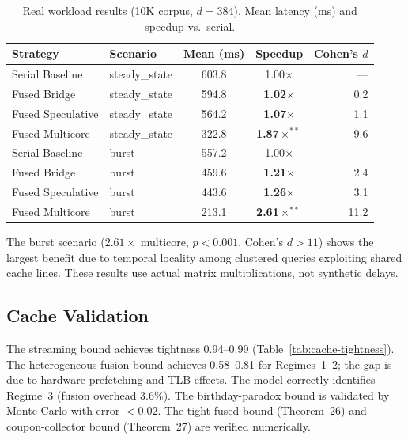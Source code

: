 \documentclass{article}
\theoremstyle{definition}
\theoremstyle{remark}
\begin{document}
\begin{table}[t]
\centering
\caption{Real workload results (10K corpus, $d{=}384$). Mean latency (ms) and speedup vs.\ serial.}\label{tab:real-workload}
\smallskip
\begin{tabular}{@{}llccr@{}}
\toprule
\textbf{Strategy} & \textbf{Scenario} & \textbf{Mean (ms)} & \textbf{Speedup} & \textbf{Cohen's $d$} \\
\midrule
Serial Baseline  & steady\_state & 603.8  & 1.00$\times$ & --- \\
Fused Bridge     & steady\_state & 594.8  & \textbf{1.02$\times$} & 0.2 \\
Fused Speculative & steady\_state & 564.2 & \textbf{1.07$\times$} & 1.1 \\
Fused Multicore  & steady\_state & 322.8  & \textbf{1.87$\times^{**}$} & 9.6 \\
\midrule
Serial Baseline  & burst & 557.2  & 1.00$\times$ & --- \\
Fused Bridge     & burst & 459.6  & \textbf{1.21$\times$} & 2.4 \\
Fused Speculative & burst & 443.6 & \textbf{1.26$\times$} & 3.1 \\
Fused Multicore  & burst & 213.1  & \textbf{2.61$\times^{**}$} & 11.2 \\
\bottomrule
\end{tabular}
\end{table}

The burst scenario ($2.61\times$ multicore, $p < 0.001$, Cohen's $d > 11$) shows the largest benefit due to temporal locality among clustered queries exploiting shared cache lines.
These results use actual matrix multiplications, not synthetic delays.

\subsection{Cache Validation}

The streaming bound achieves tightness 0.94--0.99 (Table~\ref{tab:cache-tightness}).
The heterogeneous fusion bound achieves 0.58--0.81 for Regimes~1--2; the gap is due to hardware prefetching and TLB effects.
The model correctly identifies Regime~3 (fusion overhead 3.6\%).
The birthday-paradox bound is validated by Monte Carlo with error $< 0.02$.
The tight fused bound (Theorem~26) and coupon-collector bound (Theorem~27) are verified numerically.

\end{document}
